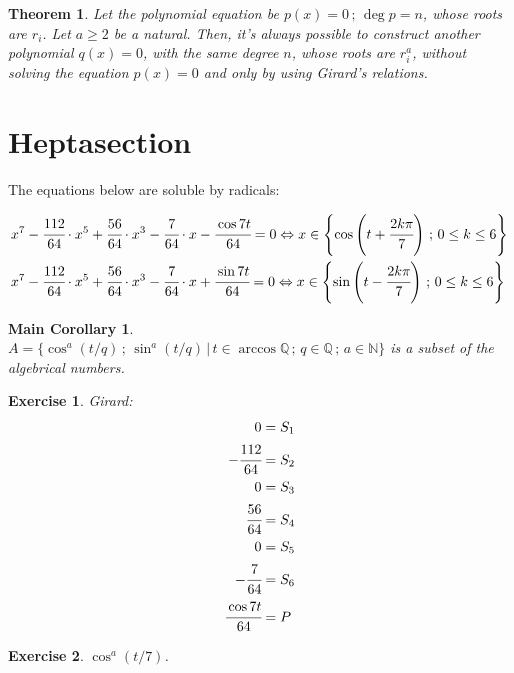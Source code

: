 \documentclass[11pt,a4paper]{article}
\newtheorem{exercise}{Exercise}
\newtheorem{thm}{Theorem}
\newtheorem*{coro}{Main Corollary}
\begin{document}
\begin{thm}
Let the polynomial equation be $p(x) = 0\,;\,\deg p = n$, whose roots are $r_i$. Let $a \ge 2$ be a natural. Then, it's always possible to construct another polynomial $q(x) = 0$, with the same degree $n$, whose roots are $r_i^a$, without solving the equation $p(x) = 0$ and only by using Girard's relations.
\end{thm}

\section{Heptasection}

The equations below are soluble by radicals:

\begin{align}
&x^7 - \cfrac{112}{64} \cdot x^5 + \cfrac{56}{64} \cdot x^3 - \cfrac{7}{64} \cdot x - \cfrac{\cos 7t}{64} = 0 \Leftrightarrow x \in \left\{ \cos \left(t + \cfrac{2k\pi}{7} \right) \,;\, 0 \le k \le 6 \right\} \\
&x^7 - \cfrac{112}{64} \cdot x^5 + \cfrac{56}{64} \cdot x^3 - \cfrac{7}{64} \cdot x + \cfrac{\sin 7t}{64} = 0 \Leftrightarrow x \in \left\{ \sin \left(t - \cfrac{2k\pi}{7} \right) \,;\, 0 \le k \le 6 \right\}
\end{align}

\vspace{3mm}

\begin{coro}
$A = \{ \cos^a (t/q)\,;\,\sin^a (t/q)\,\vert\,t \in \arccos \mathbb{Q}\,;\, q \in \mathbb{Q}\,;\,a \in \mathbb{N} \}$ is a subset of the algebrical numbers.
\end{coro}

\begin{exercise}
Girard: \\
\begin{align}
0 &= S_1 \\
- \cfrac{112}{64} &= S_2 \\
0 &= S_3 \\
\cfrac{56}{64} &= S_4 \\
0 &= S_5 \\
- \cfrac{7}{64} &= S_6 \\
\cfrac{\cos 7t}{64} &= P
\end{align}
\end{exercise}

\begin{exercise}
$\cos^a (t/7)$.
\end{exercise}
\end{document}
